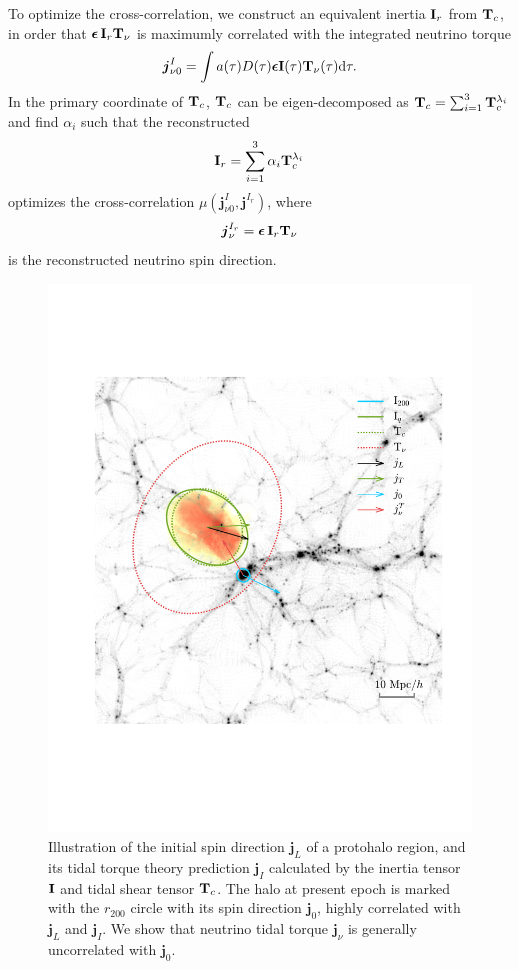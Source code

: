 \documentclass[aps,prd,twocolumn,amsmath,amssymb,amsfont,superscriptaddress]{revtex4-1}
\newcommand{\bs}{\boldsymbol}
\newcommand{\diff}{{\mathrm d}}
\begin{document}
To optimize the cross-correlation, we construct an equivalent inertia $\bold{I}_r$ from $\bold{T}_c$, in order that $\bs{\epsilon}\,\bold{I}_r\bold{T}_\nu$ is maximumly correlated with the integrated neutrino torque 
\begin{equation}\label{eq.jnu0}
\bs{j}^I_{\nu 0}=\int a(\tau)D(\tau)\bs{\epsilon}\bold{I}(\tau)\bold{T}_\nu(\tau)\diff\tau.
\end{equation}
In the primary coordinate of $\bold{T}_c$, $\bold{T}_c$ can be eigen-decomposed as $\bold{T}_c=\sum_{i=1}^3\bold{T}^{\lambda_i}_c$ and find $\alpha_i$ such that the reconstructed
\begin{equation}\label{eq.Ir}
	\bold{I}_r=\sum_{i=1}^3\alpha_i\bold{T}^{\lambda_i}_c
\end{equation}
optimizes the cross-correlation $\mu(\bs{j}^I_{\nu 0},\bs{j}^{I_r})$, where
\begin{equation}\label{eq.jnuIr}
 	\bs{j}^{I_r}_\nu=\bs{\epsilon}\,\bold{I}_r\bold{T}_\nu
\end{equation}
is the reconstructed neutrino spin direction.

\begin{figure}
\centering
  \includegraphics[width=1\linewidth]{f1}
 \caption{Illustration of the initial spin direction $\bs{j}_L$ of a protohalo region, and its tidal torque theory prediction $\bs{j}_I$ calculated by the inertia tensor $\bold{I}$ and tidal shear tensor $\bold{T}_c$. The halo at present epoch is marked with the $r_{200}$ circle with its spin direction $\bs{j}_0$, highly correlated with $\bs{j}_L$ and $\bs{j}_I$. We show that neutrino tidal torque $\bs{j}_\nu$ is generally uncorrelated with $\bs{j}_0$.}\label{fig.1}
\end{figure}
\end{document}
